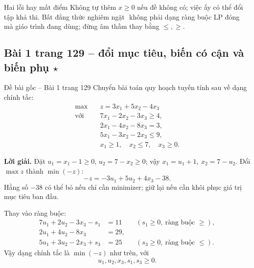 \documentclass[11pt,a4paper]{article}
\begin{document}
\begin{warningbox}{Hai lỗi hay mất điểm}
Không tự thêm \(x\ge0\) nếu đề không có; việc ấy có thể đổi tập khả thi. Bất đẳng thức nghiêm ngặt \(<,>\) không phải dạng ràng buộc LP đóng mà giáo trình đang dùng; đừng âm thầm thay bằng \(\le,\ge\).
\end{warningbox}

\subsection{Bài 1 trang 129 -- đổi mục tiêu, biến có cận và biến phụ \(\star\)}
\begin{questionbox}{Đề bài gốc -- Bài 1 trang 129}
Chuyển bài toán quy hoạch tuyến tính sau về dạng chính tắc:
\[
\begin{aligned}
\max\quad &z=3x_1+5x_2-4x_3\\
\text{với }&7x_1-2x_2-3x_3\ge4,\\
&2x_1-4x_2-8x_3=3,\\
&5x_1-3x_2-2x_3\le9,\\
&x_1\ge1,\quad x_2\le7,\quad x_3\ge0.
\end{aligned}
\]
\end{questionbox}
\textbf{Lời giải.}
Đặt \(u_1=x_1-1\ge0\), \(u_2=7-x_2\ge0\); vậy \(x_1=u_1+1,\ x_2=7-u_2\). Đổi \(\max z\) thành \(\min(-z)\):
\[
-z=-3u_1+5u_2+4x_3-38.
\]
Hằng số \(-38\) có thể bỏ nếu chỉ cần minimizer; giữ lại nếu cần khôi phục giá trị mục tiêu ban đầu.

Thay vào ràng buộc:
\[
\begin{aligned}
7u_1+2u_2-3x_3-s_1&=11 &&(s_1\ge0,\ \text{ràng buộc }\ge),\\
2u_1+4u_2-8x_3&=29,\\
5u_1+3u_2-2x_3+s_3&=25 &&(s_3\ge0,\ \text{ràng buộc }\le).
\end{aligned}
\]
Vậy dạng chính tắc là \(\min(-z)\) như trên, với
\[
u_1,u_2,x_3,s_1,s_3\ge0.
\]

\end{document}
